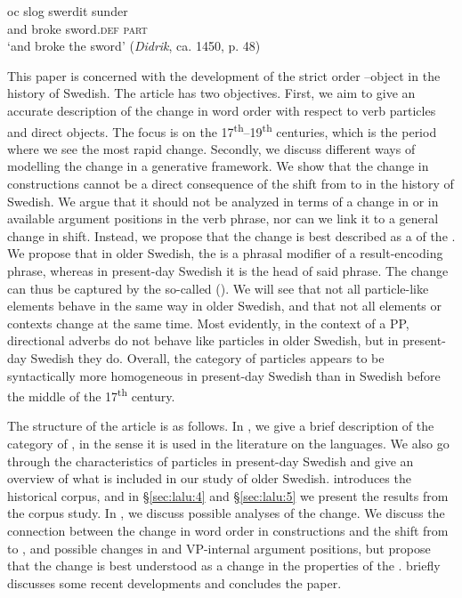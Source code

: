 \documentclass[output=paper]{langscibook}
\begin{document}
\ex
\gll oc    slog     swerdit     sunder\\
      and  broke   sword\textsc{.def}   \textsc{part}\\
  \glt  ‘and broke the sword’ (\textit{Didrik}, ca. 1450, p. 48)

\z
\z

This paper is concerned with the development of the strict order –object in the history of Swedish. The article has two objectives. First, we aim to give an accurate description of the change in word order with respect to verb particles and direct objects. The focus is on the 17\textsuperscript{th}--19\textsuperscript{th} centuries, which is the period where we see the most rapid change. Secondly, we discuss different ways of modelling the change in a generative framework. We show that the change in  constructions cannot be a direct consequence of the shift from  to  in the history of Swedish. We argue that it should not be analyzed in terms of a change in  or in available argument positions in the verb phrase, nor can we link it to a general change in  shift. Instead, we propose that the change is best described as a  of the . We propose that in older Swedish, the  is a phrasal modifier of a result-encoding phrase, whereas in present-day Swedish it is the head of said phrase. The change can thus be captured by the so-called  (\citealt{van_Gelderen2004}). We will see that not all particle-like elements behave in the same way in older Swedish, and that not all elements or contexts change at the same time. Most evidently, in the context of a PP, directional adverbs do not behave like particles in older Swedish, but in present-day Swedish they do. Overall, the category of particles appears to be syntactically more homogeneous in present-day Swedish than in Swedish before the middle of the 17\textsuperscript{th} century. 



The structure of the article is as follows. In , we give a brief description of the category of , in the sense it is used in the literature on the  languages. We also go through the characteristics of particles in present-day Swedish and give an overview of what is included in our study of older Swedish.  introduces the historical corpus, and in §\ref{sec:lalu:4} and §\ref{sec:lalu:5} we present the results from the corpus study. In , we discuss possible analyses of the change. We discuss the connection between the change in word order in  constructions and the shift from  to , and possible changes in  and VP-internal argument positions, but propose that the change is best understood as a change in the properties of the .  briefly discusses some recent developments and concludes the paper.
\end{document}
